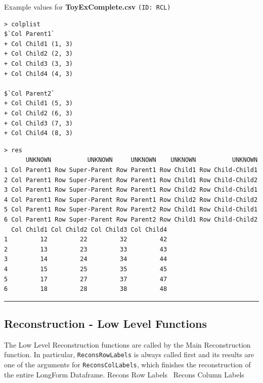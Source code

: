\documentclass[a4paper]{article}
\begin{document}
Example values for \textbf{ToyExComplete.csv} \texttt{(ID: RCL)}
\begin{verbatim}
> colplist
$`Col Parent1`
+ Col Child1 (1, 3)
+ Col Child2 (2, 3)
+ Col Child3 (3, 3)
+ Col Child4 (4, 3)

$`Col Parent2`
+ Col Child1 (5, 3)
+ Col Child2 (6, 3)
+ Col Child3 (7, 3)
+ Col Child4 (8, 3)

\end{verbatim}
\begin{verbatim}
> res
      UNKNOWN          UNKNOWN     UNKNOWN    UNKNOWN          UNKNOWN
1 Col Parent1 Row Super-Parent Row Parent1 Row Child1 Row Child-Child1
2 Col Parent1 Row Super-Parent Row Parent1 Row Child1 Row Child-Child2
3 Col Parent1 Row Super-Parent Row Parent1 Row Child2 Row Child-Child1
4 Col Parent1 Row Super-Parent Row Parent1 Row Child2 Row Child-Child2
5 Col Parent1 Row Super-Parent Row Parent2 Row Child1 Row Child-Child1
6 Col Parent1 Row Super-Parent Row Parent2 Row Child1 Row Child-Child2
  Col Child1 Col Child2 Col Child3 Col Child4
1         12         22         32         42
2         13         23         33         43
3         14         24         34         44
4         15         25         35         45
5         17         27         37         47
6         18         28         38         48
\end{verbatim}
\vspace{-1.5em}
\noindent\rule{0.25\textwidth}{0.4pt}
\vspace{0.5em}

\subsection{Reconstruction - Low Level Functions}
\label{sec:ReconsLowLevel}
The Low Level Reconstruction functions are called by the Main
Reconstruction function. In particular, \verb|ReconsRowLabels| is
always called first and its results are one of the arguments for
\verb|ReconsColLabels|, which finishes the reconstruction of the
entire LongForm Dataframe.
\nwenddocs{}\endmoddef
\LA{}Recons Row Labels~{\nwtagstyle{}}\RA{}
\LA{}Recons Column Labels~{\nwtagstyle{}}\RA{}
\nwendcode{}\nwdocspar
\end{document}
